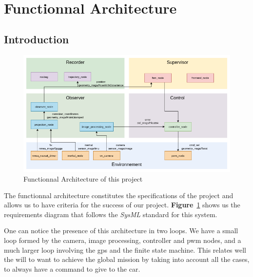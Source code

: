 \section{Functionnal Architecture}

\subsection{Introduction}

\begin{figure}[!ht]
    \begin{center}
        \includegraphics[scale=0.51]{Images/node_graph.png}
    \end{center}
    \caption{Functionnal Architecture of this project}
    \label{fig:requirement}
\end{figure}

The functionnal architecture constitutes the specifications of the project and allows us to have criteria
for the success of our project. \textbf{Figure}~\ref{fig:requirement} shows us the requirements
diagram that follows the \textit{SysML} standard for this system.

One can notice the presence of this architecture in two loops. We have a small loop formed
by the camera, image processing, controller and pwm nodes, and a much larger loop involving
the gps and the finite state machine. This relates well the will to want to achieve the
global mission by taking into account all the cases, to always have a command to give to
the car.

\newpage